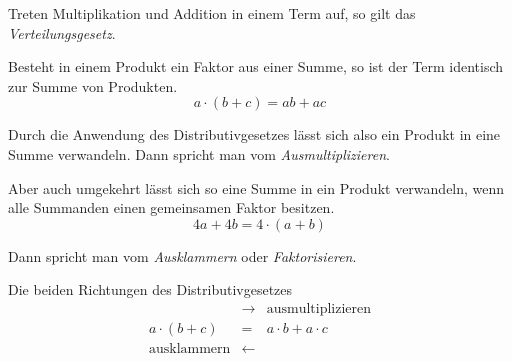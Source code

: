 \begin{center}
\end{center}

Treten Multiplikation und Addition in einem Term auf, so gilt das \emph{Verteilungsgesetz}.

\begin{regel}
 Besteht in einem Produkt ein Faktor aus einer Summe, so ist der Term identisch zur Summe von Produkten.
 \[a\cdot (b+c) = ab+ac\]
\end{regel}

\begin{regel}
Durch die Anwendung des Distributivgesetzes lässt sich also ein Produkt in eine Summe verwandeln. Dann spricht man vom \emph{Ausmultiplizieren}.

Aber auch umgekehrt lässt sich so eine Summe in ein Produkt verwandeln, wenn alle Summanden einen gemeinsamen Faktor besitzen.
\[ 4a+4b = 4\cdot (a+b)\]

Dann spricht man vom \emph{Ausklammern} oder \emph{Faktorisieren}.

\begin{whitebox}Die beiden Richtungen des Distributivgesetzes\begin{eqnarray*}
 &\rightarrow & \text{ausmultiplizieren} \\
 a\cdot (b+c)&=& a\cdot b + a\cdot c \\
 \text{ausklammern} &\leftarrow&
\end{eqnarray*}
\end{whitebox}

\end{regel}


